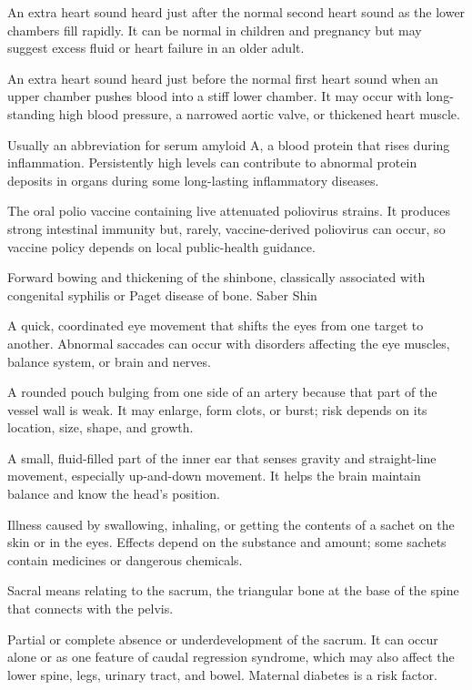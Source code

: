  An extra heart sound heard just after the normal second heart sound as the lower chambers fill rapidly. It can be normal in children and pregnancy but may suggest excess fluid or heart failure in an older adult.

 An extra heart sound heard just before the normal first heart sound when an upper chamber pushes blood into a stiff lower chamber. It may occur with long-standing high blood pressure, a narrowed aortic valve, or thickened heart muscle.

 Usually an abbreviation for serum amyloid A, a blood protein that rises during inflammation. Persistently high levels can contribute to abnormal protein deposits in organs during some long-lasting inflammatory diseases.

 The oral polio vaccine containing live attenuated poliovirus strains. It produces strong intestinal immunity but, rarely, vaccine-derived poliovirus can occur, so vaccine policy depends on local public-health guidance.

 Forward bowing and thickening of the shinbone, classically associated with congenital syphilis or Paget disease of bone.
\synonyms
Saber Shin

 A quick, coordinated eye movement that shifts the eyes from one target to another. Abnormal saccades can occur with disorders affecting the eye muscles, balance system, or brain and nerves.

 A rounded pouch bulging from one side of an artery because that part of the vessel wall is weak. It may enlarge, form clots, or burst; risk depends on its location, size, shape, and growth.

 A small, fluid-filled part of the inner ear that senses gravity and straight-line movement, especially up-and-down movement. It helps the brain maintain balance and know the head’s position.

 Illness caused by swallowing, inhaling, or getting the contents of a sachet on the skin or in the eyes. Effects depend on the substance and amount; some sachets contain medicines or dangerous chemicals.

 Sacral means relating to the sacrum, the triangular bone at the base of the spine that connects with the pelvis.

 Partial or complete absence or underdevelopment of the sacrum. It can occur alone or as one feature of caudal regression syndrome, which may also affect the lower spine, legs, urinary tract, and bowel. Maternal diabetes is a risk factor.

